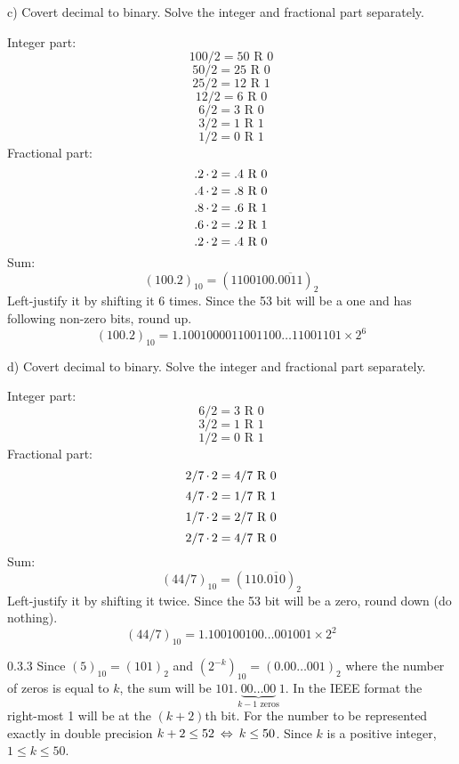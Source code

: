 \begin{task}{c)}
Covert decimal to binary. Solve the integer and fractional part separately.

Integer part:
\[100/2=50\text{ R }0\]
\[50/2=25\text{ R }0\]
\[25/2=12\text{ R }1\]
\[12/2=6\text{ R }0\]
\[6/2=3\text{ R }0\]
\[3/2=1\text{ R }1\]
\[1/2=0\text{ R }1\]
Fractional part:
\[.2\operatorname{\cdot}2=.4\text{ R }0\]
\[.4\operatorname{\cdot}2=.8\text{ R }0\]
\[.8\operatorname{\cdot}2=.6\text{ R }1\]
\[.6\operatorname{\cdot}2=.2\text{ R }1\]
\[.2\operatorname{\cdot}2=.4\text{ R }0\]
Sum:
\[(100.2)_{10}=(1100100.\overline{0011})_2\]
Left-justify it by shifting it 6 times. Since the 53 bit will be a one and has following non-zero bits, round up.
\[(100.2)_{10}=1.1001000011001100\ldots11001101 \times 2^{6}\]
\end{task}

\begin{task}{d)}
Covert decimal to binary. Solve the integer and fractional part separately.

Integer part:
\[6/2=3\text{ R }0\]
\[3/2=1\text{ R }1\]
\[1/2=0\text{ R }1\]
Fractional part:
\[2/7\operatorname{\cdot}2=4/7\text{ R }0\]
\[4/7\operatorname{\cdot}2=1/7\text{ R }1\]
\[1/7\operatorname{\cdot}2=2/7\text{ R }0\]
\[2/7\operatorname{\cdot}2=4/7\text{ R }0\]
Sum:
\[(44/7)_{10}=(110.\overline{010})_2\]
Left-justify it by shifting it twice. Since the 53 bit will be a zero, round down (do nothing).
\[(44/7)_{10}=1.100100100\ldots001001 \times 2^{2}\]
\end{task}

\begin{task}{0.3.3}
Since $(5)_{10}=(101)_2$ and $(2^{-k})_{10}=(0.00\ldots001)_2$ where the number of zeros is equal to $k$, the sum will be $101.\underbrace{00\ldots00}_{k - 1 \text{ zeros}}1$. In the IEEE format the right-most 1 will be at the $(k+2)$th bit. For the number to be represented exactly in double precision $k+2 \le 52 \lra k \le 50$. Since $k$ is a positive integer, $1 \le k \le 50$.
\end{task}